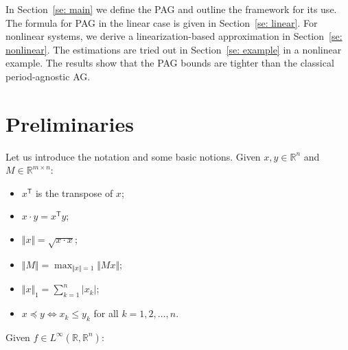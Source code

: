 \documentclass[letterpaper, 10 pt, conference]{ieeeconf}
\newcommand{\trans}{^\mathsf{T}}
\newcommand{\Linf}{L^\infty}
\newcommand{\abs}[1]{\vert #1 \vert}
\newcommand{\norm}[1]{\Vert #1 \Vert}
\newcommand{\bbR}{\mathbb{R}}
\begin{document}
In Section~\ref{se: main} we define the PAG and outline the framework for its use. The formula for PAG in the linear case is given in Section~\ref{se: linear}. For nonlinear systems, we derive a linearization-based approximation in Section~\ref{se: nonlinear}. The estimations are tried out in Section~\ref{se: example} in a nonlinear example. The results show that the PAG bounds are tighter than the classical period-agnostic AG.

\section{Preliminaries}
\label{se: preliminaries}

Let us introduce the notation and some basic notions. Given $x, y\in\bbR^n$ and $M \in \bbR^{m\times n}$:
\begin{itemize}
    \item $x\trans$ is the transpose of $x$;
    \item $x \cdot y = x\trans y$;
    \item $\norm{x} = \sqrt{x\cdot x}$;
    \item $\norm{M} = \max_{\norm{x} = 1} \norm{Mx}$;
    \item $\norm{x}_1 = \sum_{k=1}^n \abs{x_k}$;
    \item $x \preceq y \iff x_k \leq y_k$ for all $k = 1, 2, \dots, n$.
\end{itemize}
Given $f \in \Linf(\bbR, \bbR^n)$:
\end{document}
